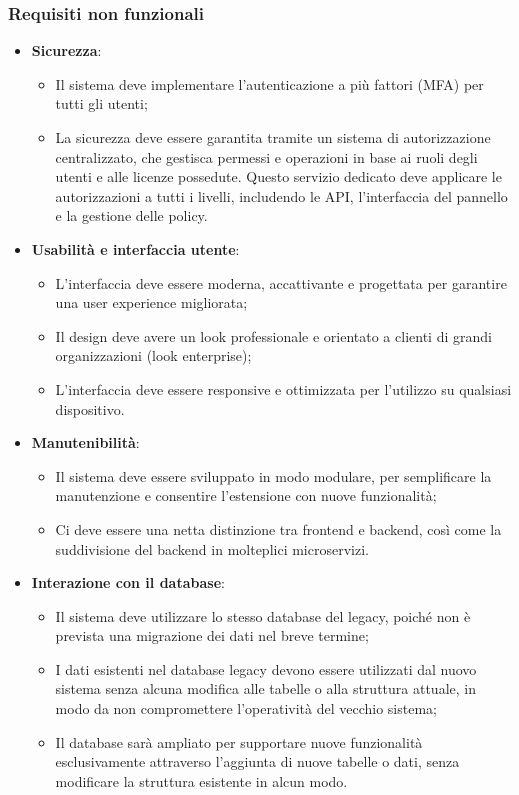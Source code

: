 \subsubsection{Requisiti non funzionali}
\begin{itemize}
  \item \textbf{Sicurezza}:
    \begin{itemize}
      \item Il sistema deve implementare l’autenticazione a più fattori (MFA) per tutti gli utenti;
      \item La sicurezza deve essere garantita tramite un sistema di autorizzazione centralizzato, che gestisca permessi e operazioni in base ai ruoli degli utenti e alle licenze possedute. Questo servizio dedicato deve applicare le autorizzazioni a tutti i livelli, includendo le API, l’interfaccia del pannello e la gestione delle policy.
    \end{itemize}

  \item \textbf{Usabilità e interfaccia utente}:
    \begin{itemize}
      \item L’interfaccia deve essere moderna, accattivante e progettata per garantire una user experience migliorata;
      \item Il design deve avere un look professionale e orientato a clienti di grandi organizzazioni (look enterprise);
      \item L’interfaccia deve essere responsive e ottimizzata per l’utilizzo su qualsiasi dispositivo.
    \end{itemize}

  \item \textbf{Manutenibilità}:
    \begin{itemize}
      \item Il sistema deve essere sviluppato in modo modulare, per semplificare la manutenzione e consentire l’estensione con nuove funzionalità;
      \item Ci deve essere una netta distinzione tra frontend e backend, così come la suddivisione del backend in molteplici microservizi.
    \end{itemize}

  \item \textbf{Interazione con il database}:
    \begin{itemize}
      \item Il sistema deve utilizzare lo stesso database del legacy, poiché non è prevista una migrazione dei dati nel breve termine;
      \item I dati esistenti nel database legacy devono essere utilizzati dal nuovo sistema senza alcuna modifica alle tabelle o alla struttura attuale, in modo da non compromettere l’operatività del vecchio sistema;
      \item Il database sarà ampliato per supportare nuove funzionalità esclusivamente attraverso l’aggiunta di nuove tabelle o dati, senza modificare la struttura esistente in alcun modo.
    \end{itemize}
\end{itemize}

